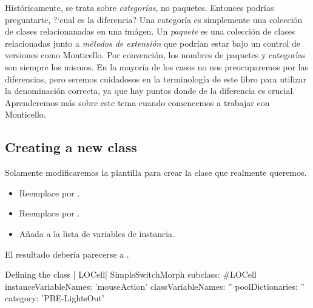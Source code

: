 \documentclass[a4paper,10pt,twoside]{book}
\begin{document}
Hist\'oricamente, se trata sobre \emph{categor\'ias}, no paquetes.
Entonces podr\'ias preguntarte, ?`cual es la diferencia?
Una categor\'ia es simplemente una colecci\'on de clases relacionanadas en
una \st im\'agen.
Un \emph{paquete} es una colecci\'on de clases relacionadas junto a
\emph{m\'etodos de extensi\'on} que podr\'ian estar bajo un control de versiones
como Monticello.
Por convenci\'on, los nombres de paquetes y categor\'ias son siempre los mismos.
En la mayor\'ia de los casos no nos preocuparemos por las diferencias, pero
seremos cuidadosos en la terminolog\'ia de este libro para utilizar la
denominaci\'on correcta, ya que hay puntos donde de la diferencia es crucial.
Aprenderemos m\'as sobre este tema cuando comencemos a trabajar con Monticello.


\subsection{Creating a new class}

Solamente modificaremos la plantilla para crear la clase que realmente queremos.

\begin{itemize}
  \item Reemplace  por .
  \item Reemplace  por .
  \item Añada  a la lista de variables de instancia.
\end{itemize}
El resultado deber\'ia parecerse a .

\begin{classdef}[firstClassDef]{Defining the class \ct| LOCell|}
SimpleSwitchMorph subclass: #LOCell
   instanceVariableNames: 'mouseAction'
   classVariableNames: ''
   poolDictionaries: ''
   category: 'PBE-LightsOut'
\end{classdef}

\end{document}
